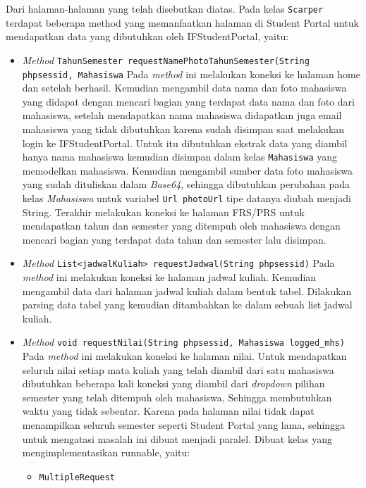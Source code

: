 Dari halaman-halaman yang telah disebutkan diatas. Pada kelas \texttt{Scarper} terdapat beberapa method yang memanfaatkan halaman di Student Portal untuk mendapatkan data yang dibutuhkan oleh IFStudentPortal, yaitu:
\begin{itemize}
	\item \textit{Method} \texttt{TahunSemester requestNamePhotoTahunSemester(String phpsessid, Mahasiswa}
	Pada \textit{method} ini melakukan koneksi ke halaman home dan setelah berhasil. Kemudian mengambil data nama dan foto mahasiswa yang didapat dengan mencari bagian yang terdapat data nama dan foto dari mahasiswa, setelah mendapatkan nama mahasiswa didapatkan juga email mahasiswa yang tidak dibutuhkan karena sudah disimpan saat melakukan login ke IFStudentPortal. Untuk itu dibutuhkan ekstrak data yang diambil hanya nama mahasiswa kemudian disimpan dalam kelas \texttt{Mahasiswa} yang memodelkan mahasiswa. Kemudian mengambil sumber data foto mahasiswa yang sudah dituliskan dalam \textit{Base64}, sehingga dibutuhkan perubahan pada kelas \textit{Mahasiswa} untuk variabel \texttt{Url photoUrl} tipe datanya diubah menjadi String. Terakhir melakukan koneksi ke halaman FRS/PRS untuk mendapatkan tahun dan semester yang ditempuh oleh mahasiswa dengan mencari bagian yang terdapat data tahun dan semester lalu disimpan.
	\item \textit{Method} \texttt{List<jadwalKuliah> requestJadwal(String phpsessid)}
	Pada \textit{method} ini melakukan koneksi ke halaman jadwal kuliah. Kemudian mengambil data dari halaman jadwal kuliah dalam bentuk tabel. Dilakukan parsing data tabel yang kemudian ditambahkan ke dalam sebuah list jadwal kuliah.
	\item \textit{Method} \texttt{void requestNilai(String phpsessid, Mahasiswa logged\_mhs)}
	Pada \textit{method} ini melakukan koneksi ke halaman nilai. Untuk mendapatkan seluruh nilai setiap mata kuliah yang telah diambil dari satu mahasiswa dibutuhkan beberapa kali koneksi yang diambil dari \textit{dropdown} pilihan semester yang telah ditempuh oleh mahasiswa, Sehingga membutuhkan waktu yang tidak sebentar. Karena pada halaman nilai tidak dapat menampilkan seluruh semester seperti Student Portal yang lama, sehingga untuk mengatasi masalah ini dibuat menjadi paralel. Dibuat kelas yang mengimplementasikan runnable, yaitu:
	\begin{itemize}
		\item \texttt{MultipleRequest}

\end{itemize}
\end{itemize}

